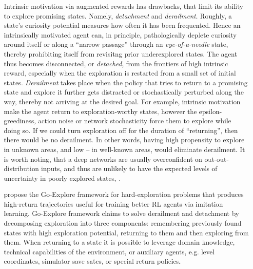 \documentclass{article}
\begin{document}
\medskip
Intrinsic motivation via augmented rewards has drawbacks, that limit its ability to
explore promising states. Namely, \emph{detachment} and \emph{derailment}.
%
Roughly, a state's curiosity potential measures how often it has been frequented. Hence
an intrinsically motivated agent can, in principle, pathologically deplete curiosity
around itself or along a ``narrow passage'' through an \emph{eye-of-a-needle} state,
thereby prohibiting itself from revisitng prior underexplored states. The agent thus
becomes disconnected, or \emph{detached}, from the frontiers of high intrinsic reward,
especially when the exploration is restarted from a small set of initial states.
%
\emph{Derailment} takes place when the policy that tries to return to a promising state
and explore it further gets distracted or stochastically perturbed along the way, thereby
not arriving at the desired goal.
%
For example, intrinsic motivation make the agent return to exploration-worthy states,
however the epsilon-greediness, action noise or network stochasticity force them to
explore while doing so. If we could turn exploration off for the duration of ``returning'',
then there would be no derailment. In other words, having high propensity to explore
in unknown areas, and low -- in well-known areas, would eliminate derailment.
%
It is worth noting, that a deep networks are usually overconfident on out-out-distribution
inputs, and thus are unlikely to have the expected levels of uncertainty in poorly explored
states, \citep[p.~34]{ecoffet_first_2021}.  %

\citet{ecoffet_go-explore_2021} propose the Go-Explore framework for hard-exploration
problems that produces high-return trajectories useful for training better RL agents
via imitation learning.
%
Go-Explore framework claims to solve derailment and detachment by decomposing exploration
into three components: remembering previously found states with high exploration potential,
returning to them and then exploring from them. When returning to a state it is possible
to leverage domain knowledge, technical capabilities of the environment, or auxiliary agents,
e.g. level coordinates, simulator save sates, or special return policies.
\end{document}
